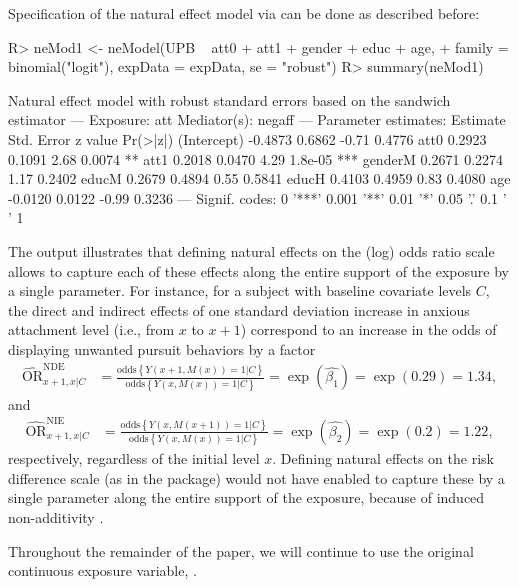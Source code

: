 \documentclass[nojss]{jss}
\begin{document}
Specification of the natural effect model via  can be done as described before:
\begin{Schunk}
\begin{Sinput}
R> neMod1 <- neModel(UPB ~ att0 + att1 + gender + educ + age,
+    family = binomial("logit"), expData = expData, se = "robust")
R> summary(neMod1)
\end{Sinput}
\begin{Soutput}
Natural effect model
with robust standard errors based on the sandwich estimator
---
Exposure: att 
Mediator(s): negaff 
---
Parameter estimates:
            Estimate Std. Error z value Pr(>|z|)    
(Intercept)  -0.4873     0.6862   -0.71   0.4776    
att0          0.2923     0.1091    2.68   0.0074 ** 
att1          0.2018     0.0470    4.29  1.8e-05 ***
genderM       0.2671     0.2274    1.17   0.2402    
educM         0.2679     0.4894    0.55   0.5841    
educH         0.4103     0.4959    0.83   0.4080    
age          -0.0120     0.0122   -0.99   0.3236    
---
Signif. codes:  0 '***' 0.001 '**' 0.01 '*' 0.05 '.' 0.1 ' ' 1
\end{Soutput}
\end{Schunk}
\par The output illustrates that defining natural effects on the (log) odds ratio scale allows to capture each of these effects along the entire support of the exposure by a single parameter. For instance, for a subject with baseline covariate levels $C$, the direct and indirect effects of one standard deviation increase in anxious attachment level (i.e., from $x$ to $x+1$) correspond to an increase in the odds of displaying unwanted pursuit behaviors by a factor 
\begin{align*}
\widehat{\mbox{OR}}^{\text{NDE}}_{x+1,x|C} &= \frac{\mbox{odds}\left\{Y(x+1,M(x))=1|C\right\}}{\mbox{odds}\left\{Y(x,M(x))=1|C\right\}} = \exp(\hat{\beta_1}) = \exp(0.29) = 1.34,
\end{align*}
and 
\begin{align*}
\widehat{\mbox{OR}}^{\text{NIE}}_{x+1,x|C} &= \frac{\mbox{odds}\left\{Y(x,M(x+1))=1|C\right\}}{\mbox{odds}\left\{Y(x,M(x))=1|C\right\}} = \exp(\hat{\beta_2}) = \exp(0.2) = 1.22,
\end{align*}
respectively, regardless of the initial level $x$. Defining natural effects on the risk difference scale (as in the  package) would not have enabled to capture these by a single parameter along the entire support of the exposure, because of induced non-additivity \citep[an artificial example illustrating this induced non-additivity is given in Figure 4 of][]{Loeys2013a}.
\par Throughout the remainder of the paper, we will continue to use the original continuous exposure variable, .
\end{document}
